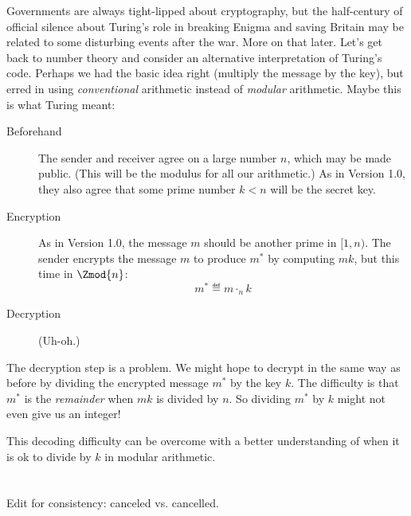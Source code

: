 Governments are always tight-lipped about cryptography, but the
half-century of official silence about Turing's role in breaking
Enigma and saving Britain may be related to some disturbing events
after the war.  More on that later.  Let's get back to number theory
and consider an alternative interpretation of Turing's code.  Perhaps
we had the basic idea right (multiply the message by the key), but
erred in using \emph{conventional} arithmetic instead of
\emph{modular} arithmetic.  Maybe this is what Turing meant:
\begin{description}

\item[Beforehand] The sender and receiver agree on a large number $n$,
  which may be made public.  (This will be the modulus for all our
  arithmetic.)  As in Version 1.0, they also agree that some prime
  number $k < n$ will be the secret key.

\item[Encryption] As in Version 1.0, the message $m$ should be another
  prime in $[1, n)$.  The sender encrypts the message $m$ to produce
    $m^*$ by computing $mk$, but this time  in $\Zmod{n}$:
\begin{equation}
m^* \eqdef m \cdot_n k \label{eq:turing-code}
\end{equation}

\item[Decryption] (Uh-oh.)

\end{description}

The decryption step is a problem.  We might hope to decrypt in the
same way as before by dividing the encrypted message $m^*$ by the key
$k$.  The difficulty is that $m^*$ is the \emph{remainder} when $mk$
is divided by $n$.  So dividing $m^*$ by $k$ might not even give us an
integer!

This decoding difficulty can be overcome with a better understanding
of when it is ok to divide by $k$ in modular arithmetic.

\section{}\label{sec:inverse}

\begin{editingnotes}
Edit for consistency: canceled vs. cancelled.
\end{editingnotes}

